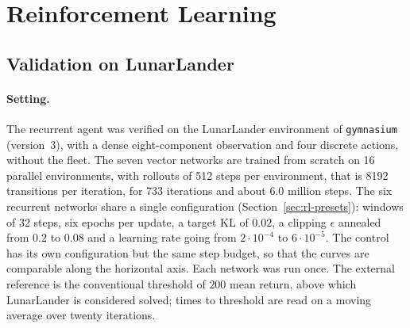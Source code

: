 \section{Reinforcement Learning}
\label{sec:res-rl}

\subsection{Validation on LunarLander}
\label{sec:res-rl-lunar}

\paragraph{Setting.}
The recurrent agent was verified on the LunarLander environment of
\texttt{gymnasium} (version~3), with a dense eight-component observation and
four discrete actions, without the fleet. The seven vector networks are trained
from scratch on \num{16} parallel environments, with rollouts of \num{512} steps
per environment, that is \num{8192} transitions per iteration, for \num{733}
iterations and about \num{6.0} million steps. The six recurrent networks share
a single configuration (Section~\ref{sec:rl-presets}): windows of \num{32}
steps, six epochs per update, a target KL of $0.02$, a clipping $\epsilon$
annealed from $0.2$ to $0.08$ and a learning rate going from $2\cdot10^{-4}$ to
$6\cdot10^{-5}$. The control has its own configuration but the same step
budget, so that the curves are comparable along the horizontal axis. Each
network was run once. The external reference is the conventional threshold of
$200$ mean return, above which LunarLander is considered solved; times to
threshold are read on a moving average over twenty iterations.

